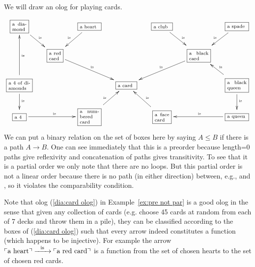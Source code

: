 \documentclass[../main/CT4S-EN-RU]{subfiles}
\begin{document}
\begin{exampleENG}\label{ex:pre not par}
We will draw an olog for playing cards. 
\begin{align}\label{dia:card olog}
\scriptsize
\xymatrixnocompile@=15pt{
\obox{}{.3in}{a diamond}\ar[dr]^{\tn{is}}&&\obox{}{.4in}{a heart}\ar[dl]_{\tn{is}}&&\obox{}{.35in}{a club}\ar[dr]^{\tn{is}}&&\obox{}{.4in}{a spade}\ar[dl]_{\tn{is}}\\
&\obox{}{.25in}{a red card}\ar[drr]^{\tn{is}}&&&&\obox{}{.4in}{a black card}\ar[dll]_{\tn{is}}\\
\obox{}{.45in}{a 4 of diamonds}\ar[d]^{\tn{is}}\ar[uu]_{\tn{is}}&&&\obox{}{.35in}{a card}&&&\obox{}{.4in}{a black queen}\ar[d]^{\tn{is}}\ar[ul]_{\tn{is}}\\
\obox{}{.2in}{a 4}\ar[rr]^{\tn{is}}&&\obox{}{.4in}{a numbered card}\ar[ur]^{\tn{is}}&&\obox{}{.3in}{a face card}\ar[ul]_{\tn{is}}&&\obox{}{.4in}{a queen}\ar[ll]_{\tn{is}}
}
\end{align}
We can put a binary relation on the set of boxes here by saying $A\leq B$ if there is a path $A\to B.$ One can see immediately that this is a preorder because length=0 paths give reflexivity and concatenation of paths gives transitivity. To see that it is a partial order we only note that there are no loops. But this partial order is not a linear order because there is no path (in either direction) between, e.g.,  and , so it violates the comparability condition.
\end{exampleENG}

\begin{exampleRUS}\label{ex:pre not par}
\end{exampleRUS}

\begin{remarkENG}
Note that olog (\ref{dia:card olog}) in Example~\ref{ex:pre not par} is a good olog in the sense that given any collection of cards (e.g. choose 45 cards at random from each of 7 decks and throw them in a pile), they can be classified according to the boxes of (\ref{dia:card olog}) such that every arrow indeed constitutes a function (which happens to be injective). For example the arrow $\textnormal{$\ulcorner$a heart$\urcorner$}\xrightarrow{\ \ \textnormal{is}\ \ }\textnormal{$\ulcorner$a red card$\urcorner$}$ is a function from the set of chosen hearts to the set of chosen red cards.
\end{remarkENG}

\begin{remarkRUS}
\end{remarkRUS}
\end{document}
